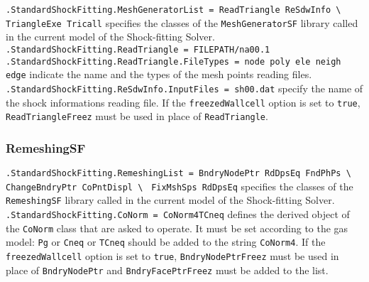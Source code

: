 \documentclass[11pt,a4paper,oneside]{article}
\begin{document}
\hspace*{1cm}\texttt{.StandardShockFitting.MeshGeneratorList = ReadTriangle ReSdwInfo \textbackslash{}}
\newline
\hspace*{9.5cm} \texttt{TriangleExe Tricall}
\newline
\newline
specifies the classes of the \texttt{MeshGeneratorSF} library called in the current model of the Shock-fitting Solver.
\newline
\newline
\hspace*{1cm} \texttt{.StandardShockFitting.ReadTriangle = FILEPATH/na00.1}
\newline
\hspace*{1cm} \texttt{.StandardShockFitting.ReadTriangle.FileTypes = node poly ele neigh edge}
\newline
\newline
indicate the name  and the types of the mesh points reading files.
\newline
\newline
\hspace*{1cm} \texttt{.StandardShockFitting.ReSdwInfo.InputFiles = sh00.dat}
\newline
\newline
specify the name of the shock informations reading file.
\newline
If the \texttt{freezedWallcell} option is set to \texttt{true}, \texttt{ReadTriangleFreez} must be used in place of \texttt{ReadTriangle}.

\subsubsection*{RemeshingSF}

\hspace*{1cm} \texttt{.StandardShockFitting.RemeshingList = BndryNodePtr RdDpsEq FndPhPs
\textbackslash{}}
\newline
\hspace*{8.6cm} \texttt{ChangeBndryPtr CoPntDispl \textbackslash{}}
\newline
\hspace*{8.6cm}\texttt{ FixMshSps RdDpsEq}
\newline
\newline
specifies the classes of the \texttt{RemeshingSF} library called in the current model of the Shock-fitting Solver.
\newline
\newline
\hspace*{1cm} \texttt{.StandardShockFitting.CoNorm = CoNorm4TCneq}
\newline
\newline
defines the derived object of the \texttt{CoNorm} class that are asked to operate. It must be set according to the gas model: \texttt{Pg} or \texttt{Cneq} or \texttt{TCneq} should be added to the string \texttt{CoNorm4}.
\newline
If the \texttt{freezedWallcell} option is set to \texttt{true}, \texttt{BndryNodePtrFreez} must be used in place of \texttt{BndryNodePtr} and \texttt{BndryFacePtrFreez} must be added to the list.
\end{document}
